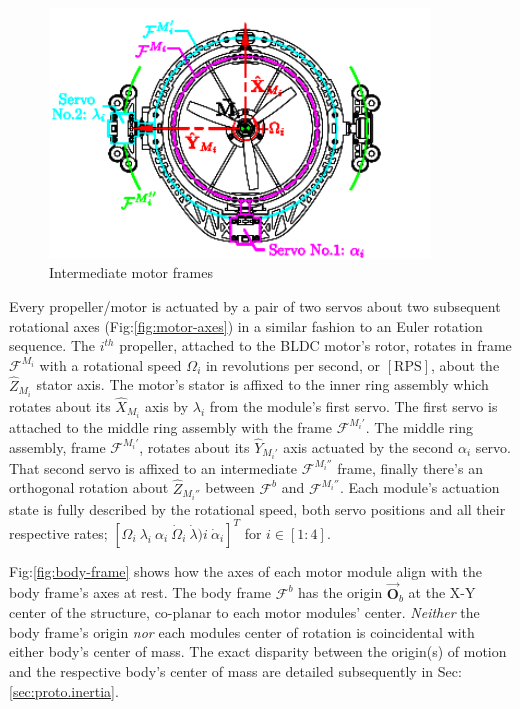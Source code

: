 \par
\begin{figure}[hbtp]
\centering
\includegraphics[width=0.9\textwidth]{figs/motor-frame}
\caption{Intermediate motor frames}
\label{fig:motor-frame}
\end{figure}
Every propeller/motor is actuated by a pair of two servos about two subsequent rotational axes (Fig:\ref{fig:motor-axes}) in a similar fashion to an Euler rotation sequence. The $i^{th}$ propeller, attached to the BLDC motor's rotor, rotates in frame $\mathcal{F}^{M_i}$ with a rotational speed $\Omega_i$ in revolutions per second, or $[\text{RPS}]$, about the $\hat{Z}_{M_i}$ stator axis. The motor's stator is affixed to the inner ring assembly which rotates about its $\hat{X}_{M_i}$ axis by $\lambda_i$ from the module's first servo. The first servo is attached to the middle ring assembly with the frame $\mathcal{F}^{M_i'}$. The middle ring assembly, frame $\mathcal{F}^{M_i'}$, rotates about its $\hat{Y}_{M_i'}$ axis actuated by the second $\alpha_i$ servo. That second servo is affixed to an intermediate $\mathcal{F}^{M_i''}$ frame, finally there's an orthogonal rotation about $\hat{Z}_{M_i''}$ between $\mathcal{F}^b$ and $\mathcal{F}^{M_i''}$. Each module's actuation state is fully described by the rotational speed, both servo positions and all their respective rates; $[\Omega_{i}~\lambda_{i}~\alpha_{i}~\dot{\Omega}_i~\dot{\lambda})i~\dot{\alpha}_i]^{T}$ for $i\in [1:4]$. 
\par
Fig:\ref{fig:body-frame} shows how the axes of each motor module align with the body frame's axes at rest. The body frame $\mathcal{F}^b$ has the origin $\vec{\mathbf{O}}_b$ at the X-Y center of the structure, co-planar to each motor modules' center. \emph{Neither} the body frame's origin \emph{nor} each modules center of rotation is coincidental with either body's center of mass. The exact disparity between the origin(s) of motion and the respective body's center of mass are detailed subsequently in Sec:\ref{sec:proto.inertia}. 

